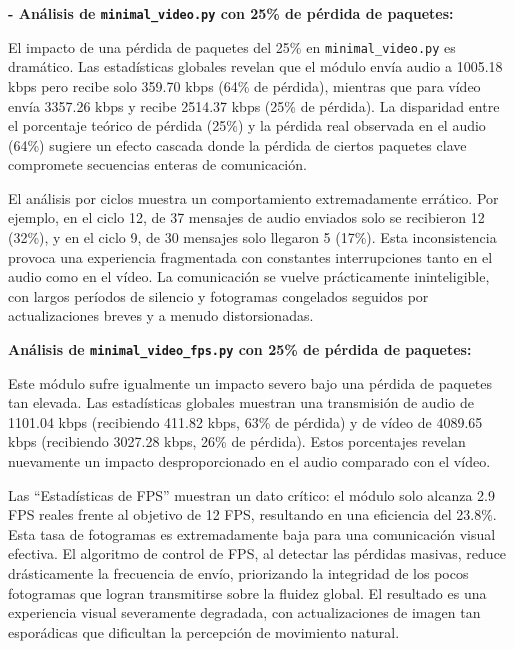 \textbf{- Análisis de \texttt{minimal\_video.py} con 25\% de pérdida de paquetes:}
\vspace{\baselineskip}

El impacto de una pérdida de paquetes del 25\% en \texttt{minimal\_video.py} es dramático. Las estadísticas globales revelan que el módulo envía audio a 1005.18 kbps pero recibe solo 359.70 kbps (64\% de pérdida), mientras que para vídeo envía 3357.26 kbps y recibe 2514.37 kbps (25\% de pérdida). La disparidad entre el porcentaje teórico de pérdida (25\%) y la pérdida real observada en el audio (64\%) sugiere un efecto cascada donde la pérdida de ciertos paquetes clave compromete secuencias enteras de comunicación.

El análisis por ciclos muestra un comportamiento extremadamente errático. Por ejemplo, en el ciclo 12, de 37 mensajes de audio enviados solo se recibieron 12 (32\%), y en el ciclo 9, de 30 mensajes solo llegaron 5 (17\%). Esta inconsistencia provoca una experiencia fragmentada con constantes interrupciones tanto en el audio como en el vídeo. La comunicación se vuelve prácticamente ininteligible, con largos períodos de silencio y fotogramas congelados seguidos por actualizaciones breves y a menudo distorsionadas.

\vspace{\baselineskip}

\textbf{Análisis de \texttt{minimal\_video\_fps.py} con 25\% de pérdida de paquetes:}
\vspace{\baselineskip}

Este módulo sufre igualmente un impacto severo bajo una pérdida de paquetes tan elevada. Las estadísticas globales muestran una transmisión de audio de 1101.04 kbps (recibiendo 411.82 kbps, 63\% de pérdida) y de vídeo de 4089.65 kbps (recibiendo 3027.28 kbps, 26\% de pérdida). Estos porcentajes revelan nuevamente un impacto desproporcionado en el audio comparado con el vídeo.

Las ``Estadísticas de FPS'' muestran un dato crítico: el módulo solo alcanza 2.9 FPS reales frente al objetivo de 12 FPS, resultando en una eficiencia del 23.8\%. Esta tasa de fotogramas es extremadamente baja para una comunicación visual efectiva. El algoritmo de control de FPS, al detectar las pérdidas masivas, reduce drásticamente la frecuencia de envío, priorizando la integridad de los pocos fotogramas que logran transmitirse sobre la fluidez global. El resultado es una experiencia visual severamente degradada, con actualizaciones de imagen tan esporádicas que dificultan la percepción de movimiento natural.

